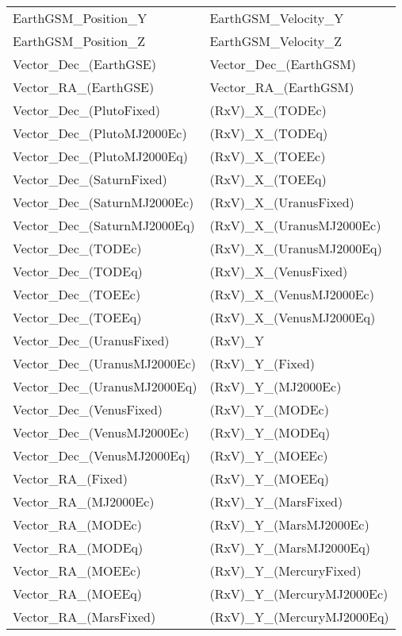 \begin{table}[htbp!]
\centering
    \begin{tabular}{ll}
    EarthGSM\_Position\_Y & EarthGSM\_Velocity\_Y\\
    EarthGSM\_Position\_Z & EarthGSM\_Velocity\_Z\\
    Vector\_Dec\_(EarthGSE) & Vector\_Dec\_(EarthGSM)\\
    Vector\_RA\_(EarthGSE) & Vector\_RA\_(EarthGSM)\\
    Vector\_Dec\_(PlutoFixed) & (RxV)\_X\_(TODEc)\\
    Vector\_Dec\_(PlutoMJ2000Ec) & (RxV)\_X\_(TODEq)\\
    Vector\_Dec\_(PlutoMJ2000Eq) & (RxV)\_X\_(TOEEc)\\
    Vector\_Dec\_(SaturnFixed) & (RxV)\_X\_(TOEEq)\\
    Vector\_Dec\_(SaturnMJ2000Ec) & (RxV)\_X\_(UranusFixed)\\
    Vector\_Dec\_(SaturnMJ2000Eq) & (RxV)\_X\_(UranusMJ2000Ec)\\
    Vector\_Dec\_(TODEc) & (RxV)\_X\_(UranusMJ2000Eq)\\
    Vector\_Dec\_(TODEq) & (RxV)\_X\_(VenusFixed)\\
    Vector\_Dec\_(TOEEc) & (RxV)\_X\_(VenusMJ2000Ec)\\
    Vector\_Dec\_(TOEEq) & (RxV)\_X\_(VenusMJ2000Eq)\\
    Vector\_Dec\_(UranusFixed) & (RxV)\_Y\\
    Vector\_Dec\_(UranusMJ2000Ec) & (RxV)\_Y\_(Fixed)\\
    Vector\_Dec\_(UranusMJ2000Eq) & (RxV)\_Y\_(MJ2000Ec)\\
    Vector\_Dec\_(VenusFixed) & (RxV)\_Y\_(MODEc)\\
    Vector\_Dec\_(VenusMJ2000Ec) & (RxV)\_Y\_(MODEq)\\
    Vector\_Dec\_(VenusMJ2000Eq) & (RxV)\_Y\_(MOEEc)\\
    Vector\_RA\_(Fixed) & (RxV)\_Y\_(MOEEq)\\
    Vector\_RA\_(MJ2000Ec) & (RxV)\_Y\_(MarsFixed)\\
    Vector\_RA\_(MODEc) & (RxV)\_Y\_(MarsMJ2000Ec)\\
    Vector\_RA\_(MODEq) & (RxV)\_Y\_(MarsMJ2000Eq)\\
    Vector\_RA\_(MOEEc) & (RxV)\_Y\_(MercuryFixed)\\
    Vector\_RA\_(MOEEq) & (RxV)\_Y\_(MercuryMJ2000Ec)\\
    Vector\_RA\_(MarsFixed) & (RxV)\_Y\_(MercuryMJ2000Eq)\\

\end{tabular}
\end{table}
